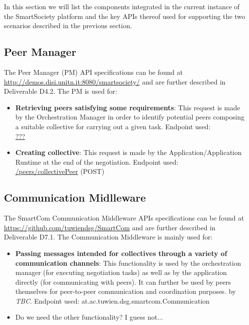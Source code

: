 In this section we will list the components integrated in the current
instance of the SmartSociety platform and the key APIs thereof
used for supporting the two scenarios described in the previous
section.

\subsection{Peer Manager}
The Peer Manager (PM) API specifications can be found at
\url{http://demos.disi.unitn.it:8080/smartsociety/} and are further
described in Deliverable D4.2. The PM is used for:
\begin{itemize}
\item {\bf Retrieving peers satisfying some requirements}: This
  request is made by the Orchestration Manager in order to identify
  potential peers composing a suitable collective for carrying out a
  given task. Endpoint used:\\
	\url{???}
\item {\bf Creating collective}: This request is made by the Application/Application Runtime at the end of the negotiation. Endpoint used:\\
	\url{/peers/collectivePeer} (\textsc{POST})
\end{itemize}


\subsection{Communication Midlleware}
The SmartCom Communication Middleware APIs specifications can be found at 
\url{https://github.com/tuwiendsg/SmartCom} and are further described in Deliverable D7.1. The Communication Middleware is mainly used for:
\begin{itemize}
\item {\bf Passing messages intended for collectives through a variety
    of communication channels}: This functionality is used by the
  orchestration manager (for executing negotiation tasks) as well as
  by the application directly (for communicating with peers). It can
  further be used by peers themselves for peer-to-peer communication
  and coordination purposes.
  by  {\it TBC}. Endpoint used: {at.ac.tuwien.dsg.smartcom.Communication}
\item Do we need the other functionality? I guess not...
\end{itemize} 


